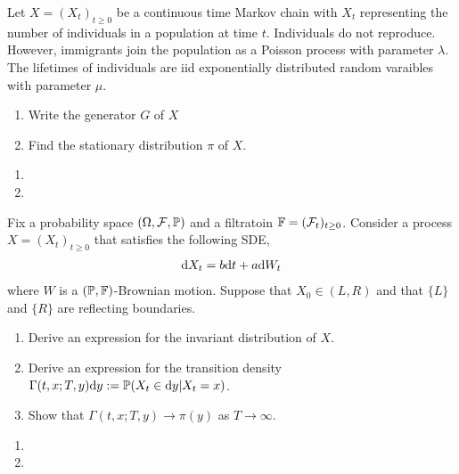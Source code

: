 \begin{problem}
Let \( X = (X_t)_{t\geq 0} \) be a continuous time Markov chain with \( X_t \) representing the number of individuals in a population at time \( t \). Individuals do not reproduce. However, immigrants join the population as a Poisson process with parameter \( \lambda \). The lifetimes of individuals are iid exponentially distributed random varaibles with parameter \( \mu \).
\begin{enumerate}[nolistsep,label=(\alph*)]
    \item Write the generator \( G \) of \( X \)
    \item Find the stationary distribution \( \pi \) of \( X \).
\end{enumerate}
\end{problem}

\begin{solution}[Solution]
\begin{enumerate}[label=(\alph*)]
    \item 
    \item 
\end{enumerate}
\end{solution}


\begin{problem}
Fix a probability space \( (\Omega, \mathcal{F},\mathbb{P}) \) and a filtratoin \( \mathbb{F} = (\mathcal{F}_t)_{t\geq 0} \). Consider a process \( X = (X_t)_{t\geq 0} \) that satisfies the following SDE,
\begin{align*}
    \mathrm{d} X_t = b\mathrm{d} t + a\mathrm{d} W_t
\end{align*}
where \( W \) is a \( (\mathbb{P},\mathbb{F}) \)-Brownian motion. Suppose that \( X_0 \in (L,R) \) and that \( \{L\} \) and \( \{R\} \) are reflecting boundaries.
\begin{enumerate}[nolistsep,label=(\alph*)]
    \item Derive an expression for the invariant distribution of \( X \).
    \item Derive an expression for the transition density \( \Gamma(t,x;T,y)\mathrm{d} y:= \mathbb{P}(X_t \in\mathrm{d} y | X_t = x) \).
    \item Show that \( \Gamma(t,x;T,y) \to \pi(y) \) as \( T\to\infty \).
\end{enumerate}

\end{problem}

\begin{solution}[Solution]
\begin{enumerate}[label=(\alph*)]
    \item 
    \item 
\end{enumerate}
\end{solution}

